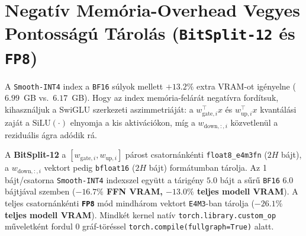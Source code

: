 \documentclass[10pt,twocolumn]{article}
\begin{document}
\section{Negatív Memória-Overhead Vegyes Pontosságú Tárolás (\texttt{BitSplit-12} és \texttt{FP8})}
\label{sec:bitsplit}

A \texttt{Smooth-INT4} index a \texttt{BF16} súlyok mellett $+13.2\%$ extra VRAM-ot igényelne ($6.99$~GB vs.\ $6.17$~GB). Hogy az index memória-felárát negatívra fordítsuk, kihasználjuk a SwiGLU szerkezeti aszimmetriáját: a $w_{\mathrm{gate},i}^\top x$ és $w_{\mathrm{up},i}^\top x$ kvantálási zaját a $\mathrm{SiLU}(\cdot)$ elnyomja a kis aktivációkon, míg a $w_{\mathrm{down},:,i}$ közvetlenül a reziduális ágra adódik rá.

A \textbf{BitSplit-12} a $[w_{\mathrm{gate},i}, w_{\mathrm{up},i}]$ párost csatornánkénti \texttt{float8\_e4m3fn} ($2H$ bájt), a $w_{\mathrm{down},:,i}$ vektort pedig \texttt{bfloat16} ($2H$ bájt) formátumban tárolja. Az 1 bájt/csatorna \texttt{Smooth-INT4} indexszel együtt a tárigény $5.0$ bájt a sűrű \texttt{BF16} $6.0$ bájtjával szemben (\textbf{$-16.7\%$ FFN VRAM, $-13.0\%$ teljes modell VRAM}). A teljes csatornánkénti \textbf{\texttt{FP8}} mód mindhárom vektort \texttt{E4M3}-ban tárolja (\textbf{$-26.1\%$ teljes modell VRAM}). Mindkét kernel natív \texttt{torch.library.custom\_op} műveletként fordul 0 gráf-töréssel \texttt{torch.compile(fullgraph=True)} alatt.
\end{document}
